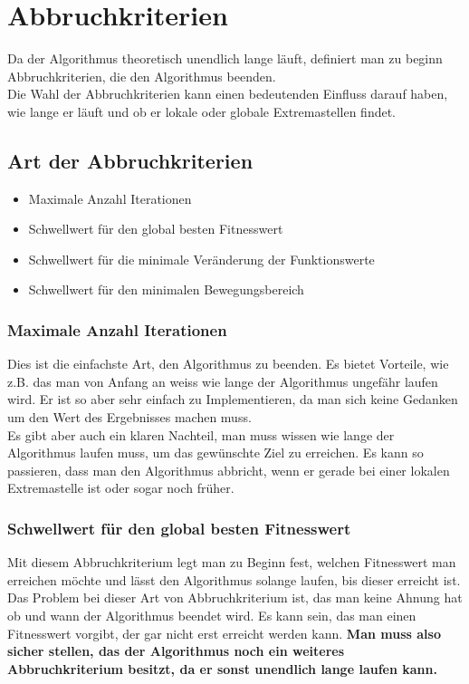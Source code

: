 \section{Abbruchkriterien}

Da der Algorithmus theoretisch unendlich lange läuft, definiert man zu beginn Abbruchkriterien, die den Algorithmus beenden.\\
Die Wahl der Abbruchkriterien kann einen bedeutenden Einfluss darauf haben, wie lange er läuft und ob er lokale oder globale Extremastellen findet.

\subsection{Art der Abbruchkriterien}

\begin{itemize}
\item Maximale Anzahl Iterationen
\item Schwellwert für den global besten Fitnesswert
\item Schwellwert für die minimale Veränderung der Funktionswerte 
\item Schwellwert für den minimalen Bewegungsbereich
\end{itemize}

\subsubsection{Maximale Anzahl Iterationen}
Dies ist die einfachste Art, den Algorithmus zu beenden. Es bietet Vorteile, wie z.B. das man von Anfang an weiss wie lange der Algorithmus ungefähr laufen wird. Er ist so aber sehr einfach zu Implementieren, da man sich keine Gedanken um den Wert des Ergebnisses machen muss. \\
Es gibt aber auch ein klaren Nachteil, man muss wissen wie lange der Algorithmus laufen muss, um das gewünschte Ziel zu erreichen. Es kann so passieren, dass man den Algorithmus abbricht, wenn er gerade bei einer lokalen Extremastelle ist oder sogar noch früher. 

\subsubsection{Schwellwert für den global besten Fitnesswert}
Mit diesem Abbruchkriterium legt man zu Beginn fest, welchen Fitnesswert man erreichen möchte und lässt den Algorithmus solange laufen, bis dieser erreicht ist.\\
Das Problem bei dieser Art von Abbruchkriterium ist, das man keine Ahnung hat ob und wann der Algorithmus beendet wird. Es kann sein, das man einen Fitnesswert vorgibt, der gar nicht erst erreicht werden kann. \textbf{Man muss also sicher stellen, das der Algorithmus noch ein weiteres Abbruchkriterium besitzt, da er sonst unendlich lange laufen kann.}

